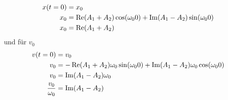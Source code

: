 \documentclass[sectionformat = exercise]{gadsescript}
\begin{document}
\begin{enumerate}[label=\alph*)]
		\begin{align*}
			x(t=0) &= x_0 \\
			x_0 &= \operatorname{Re}(A_1 + A_2)\cos(\omega_0 0) + \operatorname{Im}(A_1 - A_2)\sin(\omega_0 0 ) \\
			x_0 &= \operatorname{Re}(A_1 + A_2) \\
		 \end{align*}
		 und für $ v_0 $
		 \begin{align*}
			v(t=0) &= v_0 \\
			v_0 &= -\operatorname{Re}(A_1 + A_2)\omega_0\sin(\omega_0 0) + \operatorname{Im}(A_1 - A_2)\omega_0\cos(\omega_0 0 ) \\
			v_0 &= \operatorname{Im}(A_1 - A_2)\omega_0 \\
			\frac{ v_0 }{ \omega_0 } &= \operatorname{Im}(A_1 - A_2) \\
		\end{align*}
\end{enumerate}
\end{document}
